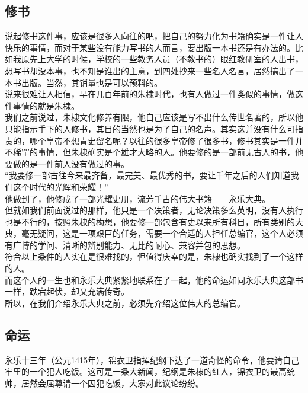 \begin{multicols}{\theparacolNo}
\subsection{修书}
说起修书这件事，应该是很多人向往的吧，把自己的努力化为书籍确实是一件让人快乐的事情，而对于某些没有能力写书的人而言，要出版一本书还是有办法的。比如我原先上大学的时候，学校的一些教务人员（不教书的）眼红教研室的人出书，想写书却没本事，也不知是谁出的主意，到四处抄来一些名人名言，居然搞出了一本书出版。当然，其销量也是可以预料的。\\

说来很难让人相信，早在几百年前的朱棣时代，也有人做过一件类似的事情，做这件事情的就是朱棣。\\

我们之前说过，朱棣文化修养有限，他自己应该是写不出什么传世名著的，所以他只能指示手下的人修书，其目的当然也是为了自己的名声。其实这并没有什么可指责的，哪个皇帝不想青史留名呢？以往的很多皇帝修了很多书，修书其实是一件并不稀罕的事情，但朱棣确实是个雄才大略的人。他要修的是一部前无古人的书，他要做的是一件前人没有做过的事。\\

“我要修一部古往今来最齐备，最完美、最优秀的书，要让千年之后的人们知道我们这个时代的光辉和荣耀！”\\

他做到了，他修成了一部光耀史册，流芳千古的伟大书籍——永乐大典。\\

但就如我们前面说过的那样，他只是一个决策者，无论决策多么英明，没有人执行也是不行的，按照朱棣的构想，他要修一部包含有史以来所有科目，所有类别的大典，毫无疑问，这是一项艰巨的任务，需要一个合适的人担任总编官，这个人必须有广博的学问、清晰的辨别能力、无比的耐心、兼容并包的思想。\\

符合以上条件的人实在是很难找的，但值得庆幸的是，朱棣也确实找到了一个这样的人。\\

而这个人的一生也和永乐大典紧紧地联系在了一起，他的命运如同永乐大典这部书一样，跌宕起伏，却又充满传奇。\\

所以，在我们介绍永乐大典之前，必须先介绍这位伟大的总编官。\\

\subsection{命运}
永乐十三年（公元1415年），锦衣卫指挥纪纲下达了一道奇怪的命令，他要请自己牢里的一个犯人吃饭。这可是一条大新闻，纪纲是朱棣的红人，锦衣卫的最高统帅，居然会屈尊请一个囚犯吃饭，大家对此议论纷纷。\\


\end{multicols}
